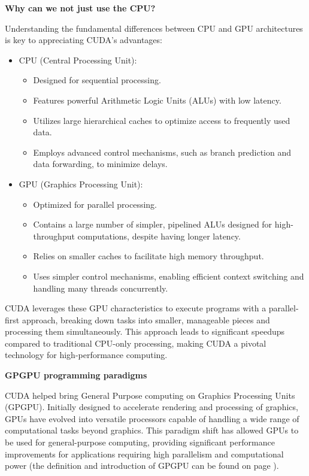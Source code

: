 \highspace
\begin{flushleft}
    \textcolor{Green3}{ \textbf{Why can we not just use the CPU?}}
\end{flushleft}
Understanding the fundamental differences between CPU and GPU architectures is key to appreciating CUDA's advantages:
\begin{itemize}
    \item CPU (Central Processing Unit):
    \begin{itemize}
        \item Designed for sequential processing.
        \item Features powerful Arithmetic Logic Units (ALUs) with low latency.
        \item Utilizes large hierarchical caches to optimize access to frequently used data.
        \item Employs advanced control mechanisms, such as branch prediction and data forwarding, to minimize delays.
    \end{itemize}

    \item GPU (Graphics Processing Unit):
    \begin{itemize}
        \item Optimized for parallel processing.
        \item Contains a large number of simpler, pipelined ALUs designed for high-throughput computations, despite having longer latency.
        \item Relies on smaller caches to facilitate high memory throughput.
        \item Uses simpler control mechanisms, enabling efficient context switching and handling many threads concurrently.
    \end{itemize}
\end{itemize}
CUDA leverages these GPU characteristics to execute programs with a parallel-first approach, breaking down tasks into smaller, manageable pieces and processing them simultaneously. This approach leads to significant speedups compared to traditional CPU-only processing, making CUDA a pivotal technology for high-performance computing.

\highspace
\begin{flushleft}
    \textcolor{Green3}{ \textbf{GPGPU programming paradigms}}
\end{flushleft}
CUDA helped bring General Purpose computing on Graphics Processing Units (GPGPU). Initially designed to accelerate rendering and processing of graphics, GPUs have evolved into versatile processors capable of handling a wide range of computational tasks beyond graphics. This paradigm shift has allowed GPUs to be used for general-purpose computing, providing significant performance improvements for applications requiring high parallelism and computational power (the definition and introduction of GPGPU can be found on page \pageref{def: General-Purpose computing on Graphics Processing Units (GPGPU)}).

